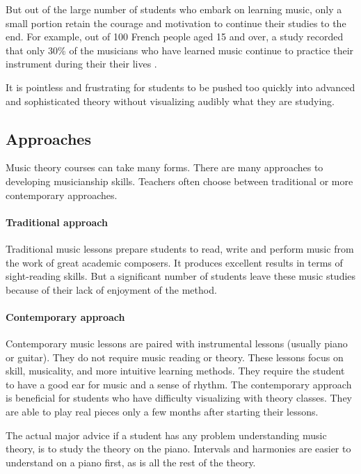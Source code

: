 But out of the large number of students who embark on learning music, only a small portion retain the courage and motivation to continue their studies to the end.
For example, out of 100 French people aged 15 and over, a study recorded that only 30\% of the musicians who have learned music continue to practice their instrument during their their lives \cite{amateurs}. 

It is pointless and frustrating for students to be pushed too quickly into advanced and sophisticated theory without visualizing audibly what they are studying.

\subsection{Approaches}

Music theory courses can take many forms. There are many approaches to developing musicianship skills. Teachers often choose between traditional or more contemporary approaches.

\paragraph*{Traditional approach}

Traditional music lessons prepare students to read, write and perform music from the work of great academic composers. It produces excellent results in terms of sight-reading skills. But a significant number of students leave these music studies because of their lack of enjoyment of the method.


\paragraph*{Contemporary approach}
Contemporary music lessons are paired with instrumental lessons (usually piano or guitar). They do not require music reading or theory. These lessons focus on skill, musicality, and more intuitive learning methods. They require the student to have a good ear for music and a sense of rhythm. The contemporary approach is beneficial for students who have difficulty visualizing with theory classes. They are able to play real pieces only a few months after starting their lessons.  


The actual major advice if a student has any problem understanding music theory, is to study the theory on the piano. Intervals and harmonies are easier to understand on a piano first, as is all the rest of the theory.

